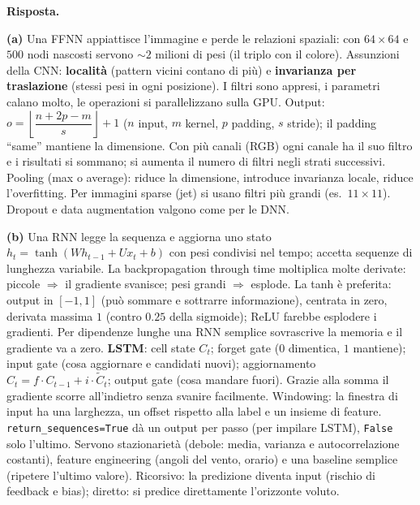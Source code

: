\documentclass[11pt,a4paper]{article}
\newcommand{\code}[1]{\texttt{#1}}
\newcommand{\Ris}[1]{\noindent\textbf{Risposta.}\par\nopagebreak #1}
\begin{document}
\Ris{
\textbf{(a)} Una FFNN appiattisce l'immagine e perde le relazioni spaziali: con $64\times64$ e $500$ nodi nascosti servono $\sim2$ milioni di pesi (il triplo con il colore).
Assunzioni della CNN: \textbf{localit\`a} (pattern vicini contano di pi\`u) e \textbf{invarianza per traslazione} (stessi pesi in ogni posizione). I filtri sono appresi, i parametri calano molto, le operazioni si parallelizzano sulla GPU.
Output: $o=\left\lfloor\dfrac{n+2p-m}{s}\right\rfloor+1$ ($n$ input, $m$ kernel, $p$ padding, $s$ stride); il padding ``same'' mantiene la dimensione.
Con pi\`u canali (RGB) ogni canale ha il suo filtro e i risultati si sommano; si aumenta il numero di filtri negli strati successivi.
Pooling (max o average): riduce la dimensione, introduce invarianza locale, riduce l'overfitting.
Per immagini sparse (jet) si usano filtri pi\`u grandi (es.\ $11\times11$). Dropout e data augmentation valgono come per le DNN.

\textbf{(b)} Una RNN legge la sequenza e aggiorna uno stato $h_t=\tanh(Wh_{t-1}+Ux_t+b)$ con pesi condivisi nel tempo; accetta sequenze di lunghezza variabile.
La backpropagation through time moltiplica molte derivate: piccole $\Rightarrow$ il gradiente svanisce; pesi grandi $\Rightarrow$ esplode.
La tanh \`e preferita: output in $[-1,1]$ (pu\`o sommare e sottrarre informazione), centrata in zero, derivata massima $1$ (contro $0.25$ della sigmoide); ReLU farebbe esplodere i gradienti.
Per dipendenze lunghe una RNN semplice sovrascrive la memoria e il gradiente va a zero.
\textbf{LSTM}: cell state $C_t$; forget gate ($0$ dimentica, $1$ mantiene); input gate (cosa aggiornare e candidati nuovi); aggiornamento $C_t=f\cdot C_{t-1}+i\cdot\tilde C_t$; output gate (cosa mandare fuori). Grazie alla somma il gradiente scorre all'indietro senza svanire facilmente.
Windowing: la finestra di input ha una larghezza, un offset rispetto alla label e un insieme di feature. \code{return\_sequences=True} d\`a un output per passo (per impilare LSTM), \code{False} solo l'ultimo.
Servono stazionariet\`a (debole: media, varianza e autocorrelazione costanti), feature engineering (angoli del vento, orario) e una baseline semplice (ripetere l'ultimo valore).
Ricorsivo: la predizione diventa input (rischio di feedback e bias); diretto: si predice direttamente l'orizzonte voluto.

}
\end{document}
